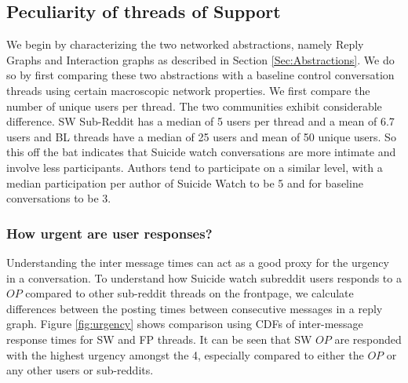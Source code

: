 \subsection{Peculiarity of threads of Support}
We begin by characterizing the two networked abstractions, namely Reply Graphs and Interaction graphs as described in Section \ref{Sec:Abstractions}. 
We do so by first comparing these two abstractions with a baseline control conversation threads using certain macroscopic network properties. 
We first compare the number of unique users per thread. The two communities exhibit considerable difference. SW Sub-Reddit has a median of 5 users per thread and a mean of 6.7 users and BL threads have a median of 25 users and mean of 50 unique users. So this off the bat indicates that Suicide watch conversations are more intimate and involve less participants. Authors tend to participate on a similar level, with a median participation per author of Suicide Watch to be 5 and for baseline conversations to be 3.

\subsubsection{How urgent are user responses?}
Understanding the inter message times can act as a good proxy for the urgency in a conversation. To understand how Suicide watch subreddit users responds to a $OP$ compared to other sub-reddit threads on the frontpage, we calculate differences between the posting times between consecutive messages in a reply graph. Figure \ref{fig:urgency} shows comparison using CDFs of inter-message response times for SW and FP threads. It can be seen that SW $OP$ are responded with the highest urgency amongst the 4, especially compared to either the $OP$ or any other users or sub-reddits. 

